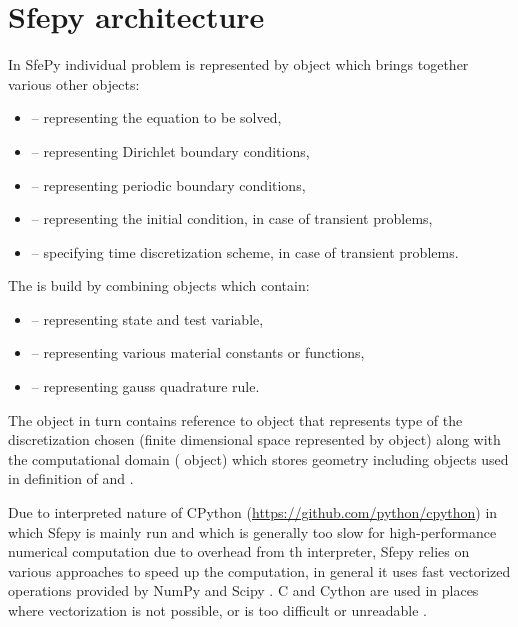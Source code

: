 \section{Sfepy architecture}
In SfePy individual problem is represented by  object which brings together various other objects:
\begin{itemize}
	\item {} -- representing the equation to be solved,
	\item {} -- representing Dirichlet boundary conditions,
	\item {} -- representing periodic boundary conditions,
	\item {} -- representing the initial condition, in case of transient problems,
	\item {} -- specifying time discretization scheme, in case of transient problems.
\end{itemize}
The  is build by combining  objects which contain:
\begin{itemize}
	\item {} -- representing state and test variable,
	\item {} -- representing various material constants or functions,
	\item {} -- representing gauss quadrature rule.
\end{itemize}
The  object in turn contains reference to  object that represents type of the 
discretization chosen (finite dimensional space represented by  object) along with the computational 
domain ( object) which stores geometry including
 objects used in definition of  and .

Due to interpreted nature of CPython (\url{https://github.com/python/cpython}) in which 
Sfepy is mainly run and which is generally too slow for high-performance numerical 
computation due to overhead from th interpreter, Sfepy relies on various approaches to 
speed up the computation, in general it uses fast vectorized operations provided by NumPy 
and Scipy \cite{SciPy-NMeth2020}. C and Cython are used in places where vectorization is 
not possible, or is too difficult or unreadable \cite{Cimrman_Lukes_Rohan_2019}. 











